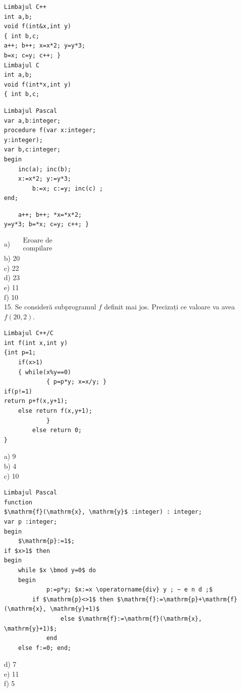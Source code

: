 \documentclass[10pt]{article}
\begin{document}
\begin{verbatim}
Limbajul C++
int a,b;
void f(int&x,int y)
{ int b,c;
a++; b++; x=x*2; y=y*3;
b=x; c=y; c++; }
Limbajul C
int a,b;
void f(int*x,int y)
{ int b,c;
\end{verbatim}

\begin{verbatim}
Limbajul Pascal
var a,b:integer;
procedure f(var x:integer;
y:integer);
var b,c:integer;
begin
    inc(a); inc(b);
    x:=x*2; y:=y*3;
        b:=x; c:=y; inc(c) ;
end;
\end{verbatim}

\begin{verbatim}
    a++; b++; *x=*x*2;
y=y*3; b=*x; c=y; c++; }
\end{verbatim}

a) $\begin{aligned} & \text { Eroare de } \\ & \text { compilare }\end{aligned}$\\
b) 20\\
c) 22\\
d) 23\\
e) 11\\
f) 10\\
15. Se consideră subprogramul $f$ definit mai jos. Precizați ce valoare va avea $f(20,2)$.

\begin{verbatim}
Limbajul C++/C
int f(int x,int y)
{int p=1;
    if(x>1)
    { while(x%y==0)
            { p=p*y; x=x/y; }
if(p!=1)
return p+f(x,y+1);
    else return f(x,y+1);
            }
        else return 0;
}
\end{verbatim}

a) 9\\
b) 4\\
c) 10

\begin{verbatim}
Limbajul Pascal
function
$\mathrm{f}(\mathrm{x}, \mathrm{y}$ :integer) : integer;
var p :integer;
begin
    $\mathrm{p}:=1$;
if $x>1$ then
begin
    while $x \bmod y=0$ do
    begin
            p:=p*y; $x:=x \operatorname{div} y ; ~ e n d ;$
        if $\mathrm{p}<>1$ then $\mathrm{f}:=\mathrm{p}+\mathrm{f}(\mathrm{x}, \mathrm{y}+1)$
                else $\mathrm{f}:=\mathrm{f}(\mathrm{x}, \mathrm{y}+1)$;
            end
    else f:=0; end;
\end{verbatim}

d) 7\\
e) 11\\
f) 5
\end{document}
